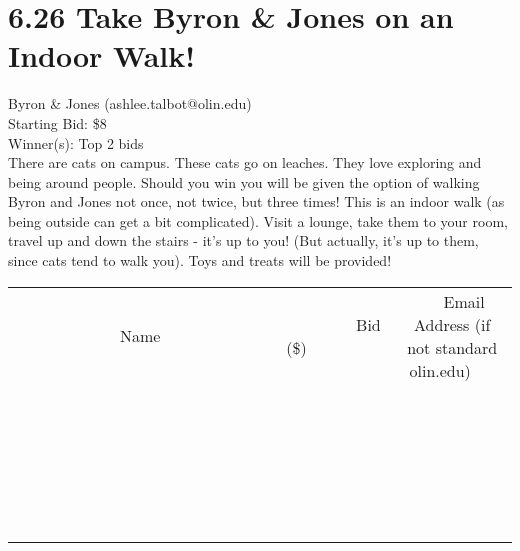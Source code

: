 \documentclass[11pt]{article}
\begin{document}
\section*{6.26 Take Byron \& Jones on an Indoor Walk!}
Byron \& Jones  (ashlee.talbot@olin.edu) \\
Starting Bid: \$8 \\
Winner(s): 
Top 2 bids \\
There are cats on campus. These cats go on leaches. They love exploring and being around people. Should you win you will be given the option of walking Byron and Jones not once, not twice, but three times! This is an indoor walk (as being outside can get a bit complicated). Visit a lounge, take them to your room, travel up and down the stairs - it's up to you! (But actually, it's up to them, since cats tend to walk you). Toys and treats will be provided! \\[6ex]
\begin{tabular}{c c c}
~~~~~~~~~~~~~Name~~~~~~~~~~~~~ & ~~~~~~~~~Bid (\$)~~~~~~~~~ & ~~~Email Address (if not standard olin.edu)~~~ \\
 & & \\
\hline
 & & \\
\hline
 & & \\
\hline
 & & \\
\hline
 & & \\
\hline
 & & \\
\hline
 & & \\
\hline
 & & \\
\hline
 & & \\
\hline
 & & \\
\hline
 & & \\
\hline
 & & \\
\hline
 & & \\
\hline
 & & \\
\hline
 & & \\
\hline
 & & \\
\hline
 & & \\
\hline
 & & \\
\hline
 & & \\
\hline
 & & \\
\hline
 & & \\
\hline
 & & \\
\hline
 & & \\
\hline
 & & \\
\hline
 & & \\
\hline
 & & \\
\hline
\end{tabular}
\clearpage
\end{document}
